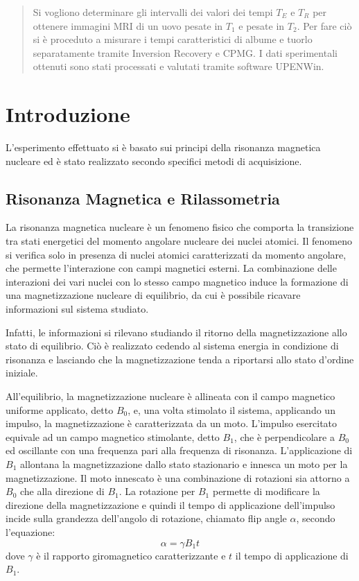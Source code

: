 \begin{abstract}

Si vogliono determinare gli intervalli dei valori dei tempi $T_E$ e $T_R$ per ottenere immagini MRI di un uovo pesate in $T_1$ e pesate in $T_2$. Per fare ciò si è proceduto a misurare i tempi caratteristici di albume e tuorlo separatamente tramite Inversion Recovery e CPMG. I dati sperimentali ottenuti sono stati processati e valutati tramite software UPENWin.

\end{abstract}

\section*{Introduzione}
L'esperimento effettuato si è basato sui principi della risonanza magnetica nucleare \cite{website} ed è stato realizzato secondo specifici metodi di acquisizione. 

\subsection*{Risonanza Magnetica e Rilassometria}

La risonanza magnetica nucleare è un fenomeno fisico che comporta la transizione tra stati energetici del momento angolare nucleare dei nuclei atomici.
Il fenomeno si verifica solo in presenza di nuclei atomici caratterizzati da momento angolare, che permette l'interazione con campi magnetici esterni.
La combinazione delle interazioni dei vari nuclei con lo stesso campo magnetico induce la formazione di una magnetizzazione nucleare di equilibrio, da cui è possibile ricavare informazioni sul sistema studiato.

Infatti, le informazioni si rilevano studiando il ritorno della magnetizzazione allo stato di equilibrio.
Ciò è realizzato cedendo al sistema energia in condizione di risonanza e lasciando che la magnetizzazione tenda a riportarsi allo stato d'ordine iniziale. 

All'equilibrio, la magnetizzazione nucleare è allineata con il campo magnetico uniforme applicato, detto $B_0$, e, una volta stimolato il sistema, applicando un impulso, la magnetizzazione è caratterizzata da un moto.
L'impulso esercitato equivale ad un campo magnetico stimolante, detto $B_1$, che è perpendicolare a $B_0$ ed oscillante con una frequenza pari alla frequenza di risonanza. 
L'applicazione di $B_1$ allontana la magnetizzazione dallo stato stazionario e innesca un moto per la magnetizzazione.
Il moto innescato è una combinazione di rotazioni sia attorno a $B_0$ che alla direzione di $B_1$.
La rotazione per $B_1$ permette di modificare la direzione della magnetizzazione e quindi il tempo di applicazione dell'impulso incide sulla grandezza dell'angolo di rotazione, chiamato flip angle $\alpha$, secondo l'equazione:
\begin{equation}
	\alpha = \gamma B_1 t
	\label{eq:flip_angle}
\end{equation}
dove $\gamma$ è il rapporto giromagnetico caratterizzante e $t$ il tempo di applicazione di $B_1$.

